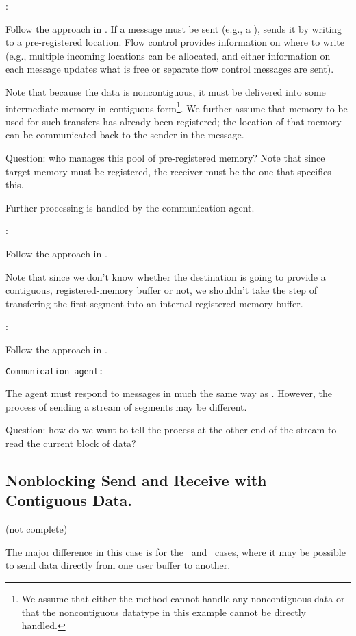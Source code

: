 :

Follow the approach in \tcpname.  
If a message must be sent (e.g., a
),  sends it by writing to
a pre-registered location.  Flow control provides information on where to
write (e.g., multiple incoming locations can be allocated, and either
information on each message updates what is free or separate flow control
messages are sent).   

Note that because the data is noncontiguous, it must be delivered into some
intermediate memory in contiguous form\footnote{We assume that either the
  method cannot handle any noncontiguous data or that the noncontiguous
  datatype in this example cannot be directly handled.}.  We further assume
that memory to be used for such transfers has already been registered; the
location of that memory can be communicated back to the sender in the
 message.  

Question: who manages this pool of pre-registered memory?  Note that since
target memory must be registered, the receiver must be the one that specifies
this.  

Further processing is handled by the communication agent.

:

Follow the approach in \tcpname.

Note that since we don't know whether the destination is going to provide a
contiguous, registered-memory buffer or not, we shouldn't take the step of
transfering the first segment into an internal registered-memory buffer.

:

Follow the approach in \tcpname.  

\texttt{Communication agent:}

The agent must respond to messages in much the same way as \tcpname.  However,
the process of sending a stream of segments may be different. 

Question: how do we want to tell the process at the other end of the stream to
read the current block of data?

\subsection{Nonblocking Send and Receive with Contiguous Data.}
(not complete)

The major difference in this case is for the \shmemname\ and \vianame\ cases,
where it may be possible to send data directly from one user buffer to
another.  

